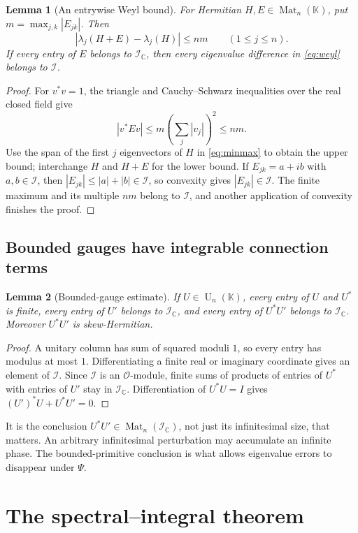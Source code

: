\documentclass[11pt,a4paper]{article}
\numberwithin{equation}{section}
\newtheorem{lemma}[lemma]{Lemma}
\theoremstyle{definition}
\theoremstyle{remark}
\newcommand{\K}{\mathbb K}
\newcommand{\C}{\mathbb C}
\newcommand{\OO}{\mathcal O}
\newcommand{\II}{\mathcal I}
\newcommand{\UU}{\operatorname U}
\newcommand{\Mat}{\operatorname{Mat}}
\begin{document}
\begin{lemma}[An entrywise Weyl bound]\label{lem:weyl}
For Hermitian $H,E\in\Mat_n(\K)$, put
$m=\max_{j,k}|E_{jk}|$. Then
\begin{equation}\label{eq:weyl}
 |\lambda_j(H+E)-\lambda_j(H)|\le nm
 \qquad(1\le j\le n).
\end{equation}
If every entry of $E$ belongs to $\II_{\C}$, then every eigenvalue
difference in \eqref{eq:weyl} belongs to $\II$.
\end{lemma}
\begin{proof}
For $v^*v=1$, the triangle and Cauchy--Schwarz inequalities over the real
closed field give
\[
 |v^*Ev|\le m\left(\sum_j|v_j|\right)^2\le nm.
\]
Use the span of the first $j$ eigenvectors of $H$ in \eqref{eq:minmax} to
obtain the upper bound; interchange $H$ and $H+E$ for the lower bound.
If $E_{jk}=a+ib$ with $a,b\in\II$, then
$|E_{jk}|\le|a|+|b|\in\II$, so convexity gives $|E_{jk}|\in\II$.
The finite maximum and its multiple $nm$ belong to $\II$, and another
application of convexity finishes the proof.
\end{proof}

\subsection{Bounded gauges have integrable connection terms}
\begin{lemma}[Bounded-gauge estimate]\label{lem:boundedgauge}
If $U\in\UU_n(\K)$, every entry of $U$ and $U^*$ is finite, every entry of
$U'$ belongs to $\II_{\C}$, and every entry of $U^*U'$ belongs to
$\II_{\C}$. Moreover $U^*U'$ is skew-Hermitian.
\end{lemma}
\begin{proof}
A unitary column has sum of squared moduli $1$, so every entry has modulus
at most $1$. Differentiating a finite real or imaginary coordinate gives an
element of $\II$. Since $\II$ is an $\OO$-module, finite sums of products
of entries of $U^*$ with entries of $U'$ stay in $\II_{\C}$.
Differentiation of $U^*U=I$ gives $(U')^*U+U^*U'=0$.
\end{proof}

It is the conclusion $U^*U'\in\Mat_n(\II_{\C})$, not just its
infinitesimal size, that matters. An arbitrary infinitesimal perturbation
may accumulate an infinite phase. The bounded-primitive conclusion is what
allows eigenvalue errors to disappear under $\Psi$.

\section{The spectral--integral theorem}\label{sec:spectralintegral}
\end{document}
